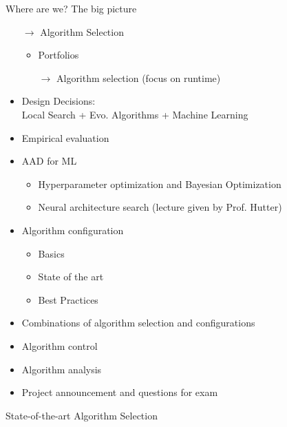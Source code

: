 \begin{frame}[c]{Where are we? The big picture}

\begin{itemize}
\item[$\to$] Algorithm Selection
  \begin{itemize}
    \item Portfolios
    \item[$\to$] Algorithm selection (focus on runtime)
  \end{itemize}
  \item Design Decisions:\\ Local Search + Evo. Algorithms + Machine Learning 
  \item Empirical evaluation
  \item AAD for ML
  \begin{itemize}
    \item Hyperparameter optimization and Bayesian Optimization 
    \item Neural architecture search (lecture given by Prof. Hutter)
  \end{itemize}
  \item Algorithm configuration 
  \begin{itemize}
    \item Basics 
    \item State of the art 
    \item Best Practices 
  \end{itemize}
  \item Combinations of algorithm selection and configurations
  \item Algorithm control 
  \item Algorithm analysis 
  \item Project announcement and questions for exam 
\end{itemize}

\end{frame}
\begin{frame}[c, fragile]{}

\centering
{\huge
State-of-the-art Algorithm Selection
}

\bigskip
\bigskip
\bigskip

\scalebox{0.8}{

}

\end{frame}
